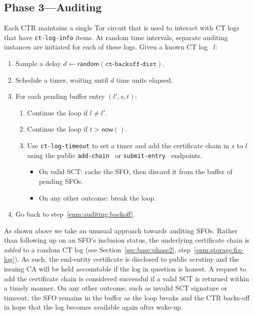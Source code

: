 \subsection{Phase 3---Auditing} \label{sec:base:phase3}
Each CTR maintains a single Tor circuit that is used to interact with CT logs
that have \texttt{ct-log-info} items.  At random time intervals, separate
auditing instances are initiated for each of these logs.  Given a known CT log~%
$l$:
\begin{enumerate}
	\item\label{enm:auditing:backoff} Sample a delay $d \gets
		\mathsf{random}(\texttt{ct-backoff-dist})$.
	\item\label{enm:auditing:sleep} Schedule a timer, waiting until $d$
		time units elapsed.
	\item\label{enm:auditing:loop} For each pending buffer entry $(l',s,t)$:
		\begin{enumerate}
			\item\label{enm:auditing:log-check} Continue the loop if $l\ne l'$.
			\item\label{enm:auditing:timestamp-check} Continue the loop if
				$t > \mathsf{now}()$.
			\item\label{enm:auditing:add-chain} Use \texttt{ct-log-timeout} to
				set a timer and add the certificate chain in $s$ to $l$ using
				the public \texttt{add-chain}~\cite{ct} or
				\texttt{submit-entry}~\cite{ct/bis} endpoints.
				\begin{itemize}
					\item\label{enm:auditing:add-chain:success} On valid
						SCT: cache the SFO, then discard it from the buffer of
						pending SFOs.
					\item\label{enm:auditing:add-chain:fail} On any other
						outcome: break the loop.
				\end{itemize}
		\end{enumerate}
	\item\label{enm:auditing:restart} Go back to
		step~\ref{enm:auditing:backoff}.
\end{enumerate}

As shown above we take an unusual approach towards auditing SFOs.  Rather than
following up on an SFO's inclusion status, the underlying certificate chain is
\emph{added} to a random CT log
	(see Section~\ref{sec:base:phase2}, step~\ref{enm:storage:fix-log}).
As such, the end-entity certificate is disclosed to public scrutiny and the
issuing CA will be held accountable if the log in question is honest.  A request
to add the certificate chain is considered successful if a valid SCT is returned
within a timely manner.  On any other outcome, such as invalid SCT signature or
timeout, the SFO remains in the buffer as the loop breaks and the CTR backs-off
in hope that the log becomes available again after wake-up.

